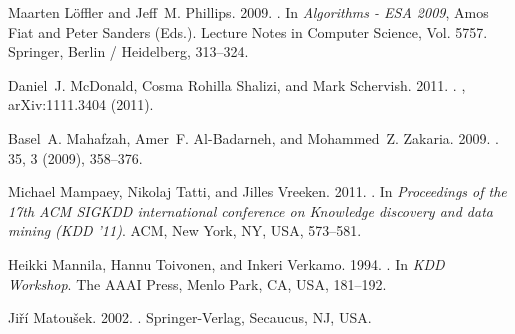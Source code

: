 \begin{thebibliography}{00}
{Maarten L\"{o}ffler} {and} {Jeff~M. Phillips}. 2009.
\newblock {}.
\newblock In {\em Algorithms - ESA 2009}, {Amos Fiat} {and} {Peter Sanders}
  (Eds.). Lecture Notes in Computer Science, Vol. 5757. Springer, Berlin /
  Heidelberg, 313--324.
\newblock
{}


  {Daniel~J. McDonald}, {Cosma Rohilla Shalizi}, {and} {Mark Schervish}. 2011.
  \newblock {}.
  , arXiv:1111.3404 (2011).

{Basel~A. Mahafzah}, {Amer~F. Al-Badarneh}, {and} {Mohammed~Z. Zakaria}. 2009.
\newblock {}.
 {35}, 3 (2009), 358--376.
\newblock
{}


{Michael Mampaey}, {Nikolaj Tatti}, {and} {Jilles Vreeken}. 2011.
\newblock {}. In {\em Proceedings of the 17th ACM SIGKDD international
  conference on Knowledge discovery and data mining} {\em (KDD '11)}. ACM, New
  York, NY, USA, 573--581.
\newblock


{Heikki Mannila}, {Hannu Toivonen}, {and} {Inkeri Verkamo}. 1994.
\newblock {}. In {\em KDD Workshop}. The AAAI Press, Menlo Park, CA, USA, 181--192.


{Ji\v{r}\'{i} Matou\v{s}ek}. 2002.
.
\newblock Springer-Verlag, Secaucus, NJ, USA.



\end{thebibliography}
